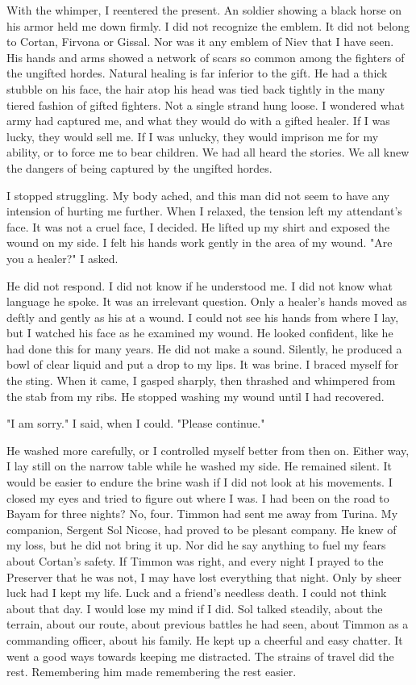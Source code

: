 \documentclass{article}
\begin{document}
With the whimper, I reentered the present. An soldier showing a black horse on his armor held me down firmly. I did not recognize the emblem. It did not belong to Cortan, Firvona or Gissal. Nor was it any emblem of Niev that I have seen. His hands and arms showed a network of scars so common among the fighters of the ungifted hordes. Natural healing is far inferior to the gift. He had a thick stubble on his face, the hair atop his head was tied back tightly in the many tiered fashion of gifted fighters. Not a single strand hung loose. I wondered what army had captured me, and what they would do with a gifted healer. If I was lucky, they would sell me. If I was unlucky, they would imprison me for my ability, or to force me to bear children. We had all heard the stories. We all knew the dangers of being captured by the ungifted hordes.

I stopped struggling. My body ached, and this man did not seem to have any intension of hurting me further. When I relaxed, the tension left my attendant's face. It was not a cruel face, I decided. He lifted up my shirt and exposed the wound on my side. I felt his hands work gently in the area of my wound. "Are you a healer?" I asked.

He did not respond. I did not know if he understood me. I did not know what language he spoke. It was an irrelevant question. Only a healer's hands moved as deftly and gently as his at a wound. I could not see his hands from where I lay, but I watched his face as he examined my wound. He looked confident, like he had done this for many years. He did not make a sound. Silently, he produced a bowl of clear liquid and put a drop to my lips. It was brine. I braced myself for the sting. When it came, I gasped sharply, then thrashed and whimpered from the stab from my ribs. He stopped washing my wound until I had recovered.

"I am sorry." I said, when I could. "Please continue."

He washed more carefully, or I controlled myself better from then on. Either way, I lay still on the narrow table while he washed my side. He remained silent. It would be easier to endure the brine wash if I did not look at his movements. I closed my eyes and tried to figure out where I was. I had been on the road to Bayam for three nights? No, four. Timmon had sent me away from Turina. My companion, Sergent Sol Nicose, had proved to be plesant company. He knew of my loss, but he did not bring it up. Nor did he say anything to fuel my fears about Cortan's safety. If Timmon was right, and every night I prayed to the Preserver that he was not, I may have lost everything that night. Only by sheer luck had I kept my life. Luck and a friend's needless death. I could not think about that day. I would lose my mind if I did. Sol talked steadily, about the terrain, about our route, about previous battles he had seen, about Timmon as a commanding officer, about his family. He kept up a cheerful and easy chatter. It went a good ways towards keeping me distracted. The strains of travel did the rest. Remembering him made remembering the rest easier.
\end{document}
